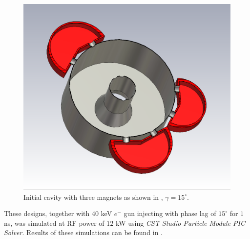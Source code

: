 \documentclass[a4paper,oneside,12pt]{report}
\numberwithin{equation}{chapter}
\begin{document}
\begin{figure}[H]
    \centering
    \includegraphics[width=.8\linewidth]{./figures/cst/cst_second_design2.png}
    \vspace{20pt}
    \caption{Initial cavity with three magnets as shown in , $\gamma=15^\circ$.}
    \label{fig:initial_three_magnet_design}
\end{figure}
These designs, together with $40$ keV $e^-$ gun injecting with phase lag of $15^\circ$ for $1$ ns, was simulated at RF power of $12$ kW using \textit{CST Studio Particle Module PIC Solver}.
Results of these simulations can be found in .
\end{document}
